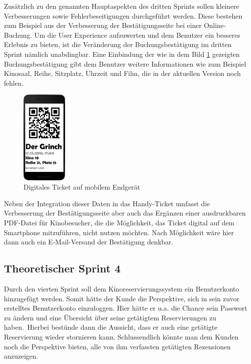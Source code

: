 Zusätzlich zu den genannten Hauptaspekten des dritten Sprints sollen kleinere Verbesserungen sowie Fehlerbeseitigungen durchgeführt werden.
Diese bestehen zum Beispiel aus der Verbesserung der Bestätigungsseite bei einer Online-Buchung.
Um die User Experience aufzuwerten und dem Benutzer ein besseres Erlebnis zu bieten, ist die Veränderung der Buchungsbestätigung im dritten Sprint nämlich unabdingbar.
Eine Einbindung der wie in dem Bild \ref{fig:ticket_phone} gezeigten Buchungsbestätigung gibt dem Benutzer weitere Informationen wie zum Beispiel Kinosaal, Reihe, Sitzplatz, Uhrzeit und Film, die in der aktuellen Version noch fehlen.

\begin{figure}[ht]
	\centering
	\includegraphics[width=0.2\textwidth]{img/ticket_phone}
	\captionsetup{format=hang}
	\caption{Digitales Ticket auf mobilem Endgerät}
	\label{fig:ticket_phone}
\end{figure}

Neben der Integration dieser Daten in das Handy-Ticket umfasst die Verbesserung der Bestätigungsseite aber auch das Ergänzen einer ausdruckbaren PDF-Datei für Kinobesucher, die die Möglichkeit, das Ticket digital auf dem Smartphone mitzuführen, nicht nutzen möchten.
Nach Möglichkeit wäre hier dann auch ein E-Mail-Versand der Bestätigung denkbar.

\subsection{Theoretischer Sprint 4}
\label{ssssec:sprint_benuterkonto}
\authorsection{\authorSG}
Durch den vierten Sprint soll dem Kinoreservierungssystem ein Benutzerkonto hinzugefügt werden.
Somit hätte der Kunde die Perspektive, sich in sein zuvor erstelltes Benutzerkonto einzuloggen.
Hier hätte er u.a. die Chance sein Passwort zu ändern und eine Übersicht über seine getätigtem Reservierungen zu haben.\
Hierbei bestünde dann die Aussicht, dass er auch eine getätigte Reservierung wieder stornieren kann.
Schlussendlich könnte man dem Kunden noch die Perspektive bieten, alle von ihm verfassten getätigten Rezensionen anzuzeigen.

